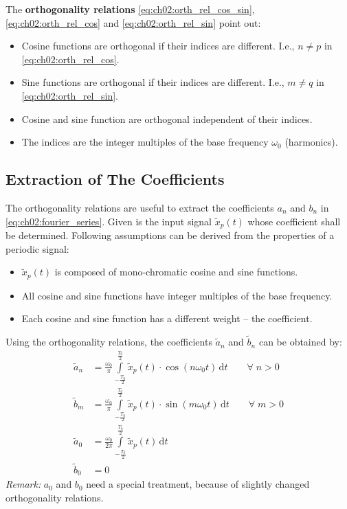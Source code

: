 \begin{refsection}
The  \textbf{orthogonality relations} \eqref{eq:ch02:orth_rel_cos_sin}, \eqref{eq:ch02:orth_rel_cos} and \eqref{eq:ch02:orth_rel_sin} point out:
\begin{itemize}
	\item Cosine functions are orthogonal if their indices are different. I.e., $n \neq p$ in \eqref{eq:ch02:orth_rel_cos}.
	\item Sine functions are orthogonal if their indices are different. I.e., $m \neq q$ in \eqref{eq:ch02:orth_rel_sin}.
	\item Cosine and sine function are orthogonal independent of their indices.
	\item The indices are the integer multiples of the base frequency $\omega_0$ (harmonics).
\end{itemize}

\subsection{Extraction of The Coefficients}

The orthogonality relations are useful to extract the coefficients $a_n$ and $b_n$ in \eqref{eq:ch02:fourier_series}. Given is the input signal $\tilde{x}_p(t)$ whose coefficient shall be determined. Following assumptions can be derived from the properties of a periodic signal:
\begin{itemize}
	\item $\tilde{x}_p(t)$ is composed of mono-chromatic cosine and sine functions.
	\item All cosine and sine functions have integer multiples of the base frequency.
	\item Each cosine and sine function has a different weight -- the coefficient.
\end{itemize}

Using the orthogonality relations, the coefficients $\tilde{a}_n$ and $\tilde{b}_n$ can be obtained by:
\begin{subequations}
	\begin{align}
		\tilde{a}_n &= \frac{\omega_0}{\pi} \int\limits_{-\frac{T_0}{2}}^{\frac{T_0}{2}} \tilde{x}_p(t) \cdot \cos\left(n \omega_0 t\right) \, \mathrm{d} t \label{eq_ch02_fourier_series_coeff_an} \qquad \forall \; n > 0 \\
		\tilde{b}_m &= \frac{\omega_0}{\pi} \int\limits_{-\frac{T_0}{2}}^{\frac{T_0}{2}} \tilde{x}_p(t) \cdot \sin\left(m \omega_0 t\right) \, \mathrm{d} t \label{eq_ch02_fourier_series_coeff_bm} \qquad \forall \; m > 0 \\
		\tilde{a}_0 &= \frac{\omega_0}{2 \pi} \int\limits_{-\frac{T_0}{2}}^{\frac{T_0}{2}} \tilde{x}_p(t) \, \mathrm{d} t \\
		\tilde{b}_0 &= 0
	\end{align}
\end{subequations}
\textit{Remark: } $a_0$ and $b_0$ need a special treatment, because of slightly changed orthogonality relations.


\end{refsection}
